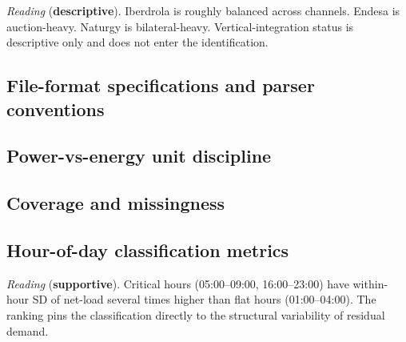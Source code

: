 \documentclass[11pt,a4paper]{article}
\begin{document}
\begin{table}[H]
\centering
\caption{\textbf{Firms in the analysis sample (detailed).} Channel-segregated 2025 shares. Channel denominators are channel-specific (they do not sum across rows).}
\label{tab:firm_descriptive}

\end{table}

\textit{Reading} (\textbf{descriptive}). Iberdrola is roughly balanced across channels. Endesa is auction-heavy. Naturgy is bilateral-heavy. Vertical-integration status is descriptive only and does not enter the identification.

\subsection{File-format specifications and parser conventions}

\subsection{Power-vs-energy unit discipline}

\subsection{Coverage and missingness}

\subsection{Hour-of-day classification metrics}\label{app:hour_metrics}

\begin{table}[H]
\centering
\caption{\textbf{Hour-of-day classification metrics, Spain 2025.} Mean load, solar, net-load (= load $-$ wind $-$ solar), within-hour SD of net-load, and signed within-hour load change $\Delta\text{load} = \text{load}_{q_4} - \text{load}_{q_1}$, by clock-hour.}
\label{tab:hour_classification}

\end{table}

\textit{Reading} (\textbf{supportive}). Critical hours (05:00--09:00, 16:00--23:00) have within-hour SD of net-load several times higher than flat hours (01:00--04:00). The ranking pins the classification directly to the structural variability of residual demand.


\nocite{*}


\end{document}
